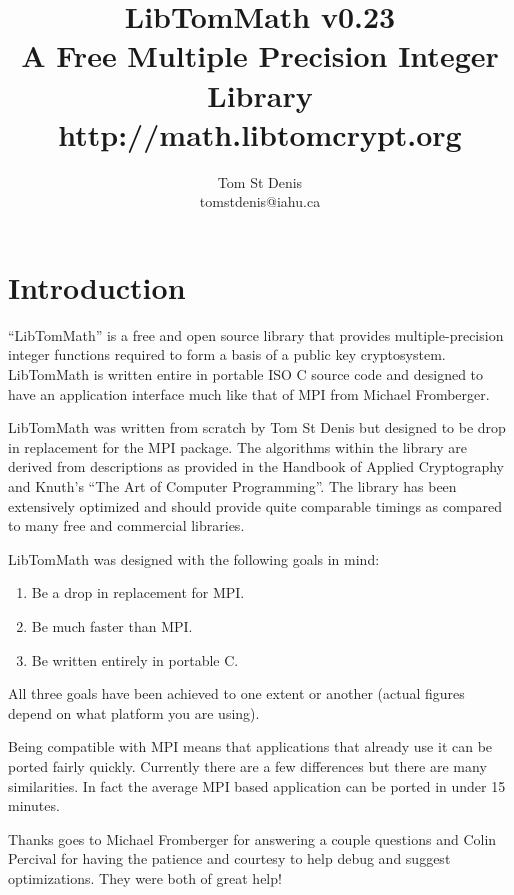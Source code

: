 \documentclass[]{article}
\begin{document}
\title{LibTomMath v0.23 \\ A Free Multiple Precision Integer Library \\ http://math.libtomcrypt.org }
\author{Tom St Denis \\ tomstdenis@iahu.ca}
\maketitle
\newpage

\section{Introduction}
``LibTomMath'' is a free and open source library that provides multiple-precision integer functions required to form a 
basis of a public key cryptosystem.  LibTomMath is written entire in portable ISO C source code and designed to have an 
application interface much like that of MPI from Michael Fromberger.  

LibTomMath was written from scratch by Tom St Denis but designed to be  drop in replacement for the MPI package.  The 
algorithms within the library are derived from descriptions as provided in the Handbook of Applied Cryptography and Knuth's
``The Art of Computer Programming''.  The library has been extensively optimized and should provide quite comparable 
timings as compared to many free and commercial libraries.

LibTomMath was designed with the following goals in mind:
\begin{enumerate}
\item Be a drop in replacement for MPI.
\item Be much faster than MPI.
\item Be written entirely in portable C.
\end{enumerate}

All three goals have been achieved to one extent or another (actual figures depend on what platform you are using).

Being compatible with MPI means that applications that already use it can be ported fairly quickly.  Currently there are 
a few differences but there are many similarities.  In fact the average MPI based application can be ported in under 15
minutes.  

Thanks goes to Michael Fromberger for answering a couple questions and Colin Percival for having the patience and courtesy to
help debug and suggest optimizations.  They were both of great help!
\end{document}
